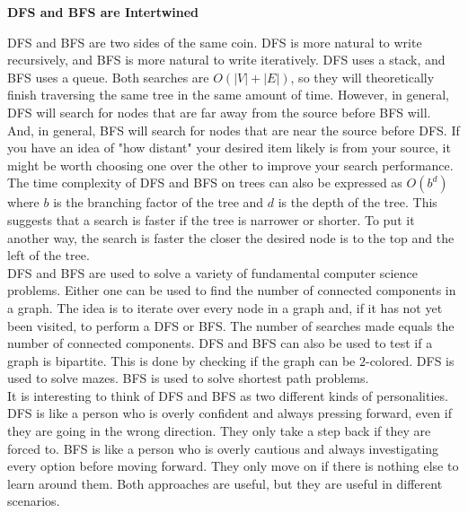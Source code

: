 \begin{tcolorbox}[enhanced, colback=textbook-blue, sharp corners]
    \vspace{2mm}
    \begin{center}
        \textbf{DFS and BFS are Intertwined}
    \end{center}
    
    DFS and BFS are two sides of the same coin. DFS is more natural to write recursively, and BFS is more natural to write iteratively. DFS uses a stack, and BFS uses a queue. Both searches are $O(|V|+|E|)$, so they will theoretically finish traversing the same tree in the same amount of time. However, in general, DFS will search for nodes that are far away from the source before BFS will. And, in general, BFS will search for nodes that are near the source before DFS. If you have an idea of "how distant" your desired item likely is from your source, it might be worth choosing one over the other to improve your search performance. \\
    
    The time complexity of DFS and BFS on trees can also be expressed as $O(b^d)$ where $b$ is the branching factor of the tree and $d$ is the depth of the tree. This suggests that a search is faster if the tree is narrower or shorter. To put it another way, the search is faster the closer the desired node is to the top and the left of the tree. \\
    
    DFS and BFS are used to solve a variety of fundamental computer science problems. Either one can be used to find the number of connected components in a graph. The idea is to iterate over every node in a graph and, if it has not yet been visited, to perform a DFS or BFS. The number of searches made equals the number of connected components. DFS and BFS can also be used to test if a graph is bipartite. This is done by checking if the graph can be $2$-colored. DFS is used to solve mazes. BFS is used to solve shortest path problems. \\
    
    It is interesting to think of DFS and BFS as two different kinds of personalities. DFS is like a person who is overly confident and always pressing forward, even if they are going in the wrong direction. They only take a step back if they are forced to. BFS is like a person who is overly cautious and always investigating every option before moving forward. They only move on if there is nothing else to learn around them. Both approaches are useful, but they are useful in different scenarios. \\
\end{tcolorbox}
\vspace{5mm}

